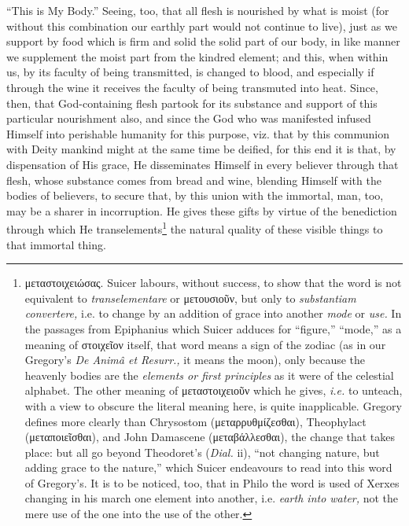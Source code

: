 “This is My Body.” Seeing, too, that all flesh is nourished by what is moist (for without this combination our earthly part would not continue to live), just as we support by food which is firm and solid the solid part of our body, in like manner we supplement the moist part from the kindred element; and this, when within us, by its faculty of being transmitted, is changed to blood, and especially if through the wine it receives the faculty of being transmuted into heat. Since, then, that God-containing flesh partook for its substance and support of this particular nourishment also, and since the God who was manifested infused Himself into perishable humanity for this purpose, viz. that by this communion with Deity mankind might at the same time be deified, for this end it is that, by dispensation of His grace, He disseminates Himself in every believer through that flesh, whose substance comes from bread and wine, blending Himself with the bodies of believers, to secure that, by this union with the immortal, man, too, may be a sharer in incorruption. He gives these gifts by virtue of the benediction through which He transelements\footnote{\textgreek{μεταστοιχειώσας}. Suicer labours, without success, to show that the word is not equivalent to \emph{transelementare} or \textgreek{μετουσιοῦν}, but only to \emph{substantiam convertere,} i.e. to change by an addition of grace into another \emph{mode} or \emph{use.} In the passages from Epiphanius which Suicer adduces for “figure,” “mode,” as a meaning of \textgreek{στοιχεῖον} itself, that word means a sign of the zodiac (as in our Gregory’s \emph{De Animâ et Resurr.,} it means the moon), only because the heavenly bodies are the \emph{elements or first principles} as it were of the celestial alphabet. The other meaning of \textgreek{μεταστοιχειοῦν} which he gives, \emph{i.e.} to unteach, with a view to obscure the literal meaning here, is quite inapplicable. Gregory defines more clearly than Chrysostom (\textgreek{μεταρρυθμίζεσθαι}), Theophylact (\textgreek{μεταποιεῖσθαι}), and John Damascene (\textgreek{μεταβάλλεσθαι}), the change that takes place: but all go beyond Theodoret’s (\emph{Dial.} ii), “not changing nature, but adding grace to the nature,” which Suicer endeavours to read into this word of Gregory’s. It is to be noticed, too, that in Philo the word is used of Xerxes changing in his march one element into another, i.e. \emph{earth into water,} not the mere use of the one into the use of the other.} the natural quality of these visible things to that immortal thing.

